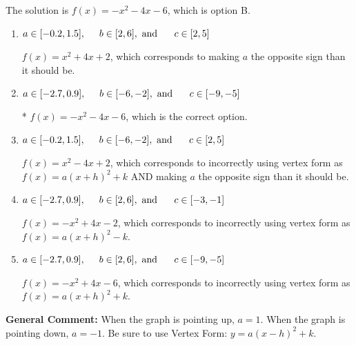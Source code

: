 \documentclass{extbook}[14pt]
\begin{document}
\begin{enumerate}
{The solution is \( f(x) = -x^{2} -4 x -6 \), which is option B.\begin{enumerate}[label=\Alph*.]
\item \( a \in [-0.2, 1.5], \hspace*{5mm} b \in [2, 6], \text{ and } \hspace*{5mm} c \in [2, 5] \)

$f(x)=x^{2} +4 x + 2$, which corresponds to making $a$ the opposite sign than it should be.
\item \( a \in [-2.7, 0.9], \hspace*{5mm} b \in [-6, -2], \text{ and } \hspace*{5mm} c \in [-9, -5] \)

* $f(x)=-x^{2} -4 x -6$, which is the correct option.
\item \( a \in [-0.2, 1.5], \hspace*{5mm} b \in [-6, -2], \text{ and } \hspace*{5mm} c \in [2, 5] \)

$f(x)=x^{2} -4 x + 2$, which corresponds to incorrectly using vertex form as $f(x) = a(x+h)^2+k$ AND making $a$ the opposite sign than it should be.
\item \( a \in [-2.7, 0.9], \hspace*{5mm} b \in [2, 6], \text{ and } \hspace*{5mm} c \in [-3, -1] \)

$f(x)=-x^{2} +4 x -2$, which corresponds to incorrectly using vertex form as $f(x) = a(x+h)^2 - k$.
\item \( a \in [-2.7, 0.9], \hspace*{5mm} b \in [2, 6], \text{ and } \hspace*{5mm} c \in [-9, -5] \)

$f(x)=-x^{2} +4 x -6$, which corresponds to incorrectly using vertex form as $f(x) = a(x+h)^2+k$.
\end{enumerate}

\textbf{General Comment:} When the graph is pointing up, $a=1$. When the graph is pointing down, $a=-1$. Be sure to use Vertex Form: $y = a(x-h)^2+k$.
}
\end{enumerate}
\end{document}
